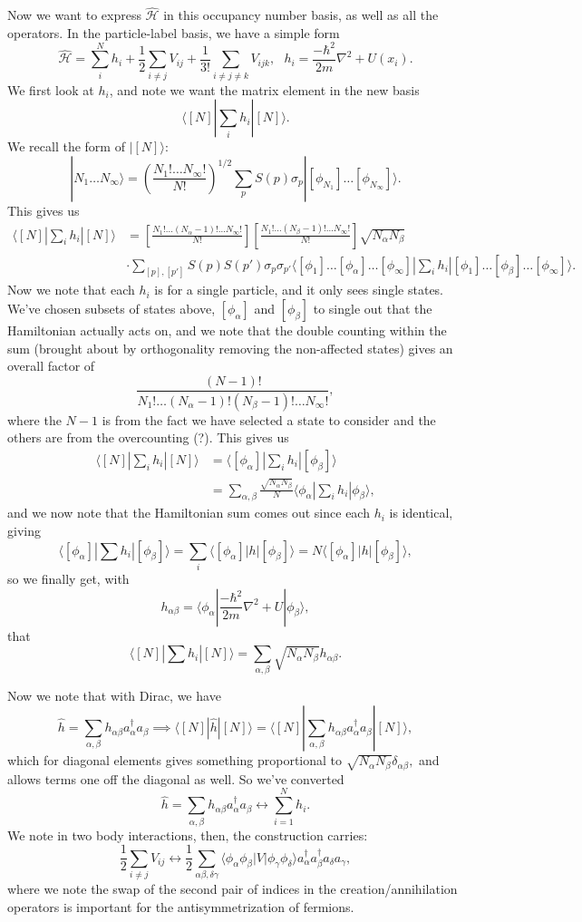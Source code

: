 \documentclass[fontsize=12pt]{scrartcl}
\newcommand{\la}{\langle}
\newcommand{\ra}{\rangle}
\newcommand{\Ham}{\hat{\mathcal{H}}}
\begin{document}
Now we want to express $\Ham$ in this occupancy number basis, as  well as all the operators. In the particle-label basis, we have a simple form $$\Ham=\sum_i^N h_i + \frac{1}{2}\sum_{i\neq j} V_{ij} + \frac{1}{3!}\sum_{i\neq j\neq k} V_{ijk}, \ \ \ h_i = \frac{-\hbar^2}{2m}\nabla^2 + U(x_i).$$ We first look at $h_i$, and note we want the matrix element in the new basis $$\la [N] | \sum_i h_i |[N]\ra.$$ We recall the form of $|[N]\ra$: $$|N_1\dots N_\infty\ra = \left(\frac{N_1!\dots N_\infty!}{N!}\right)^{1/2} \sum_p S(p)\sigma_p|[\phi_{N_1}]\dots[\phi_{N_\infty}]\ra.$$ This gives us \begin{align*} \la [N]|\sum_i h_i |[N]\ra &= \left[\frac{N_1!\dots (N_\alpha-1)!\dots N_\infty!}{N!}\right]\left[\frac{N_1!\dots (N_\beta-1)!\dots N_\infty!}{N!}\right] \sqrt{N_\alpha N_\beta}\\
&\cdot \sum_{[p],[p']}S(p)S(p')\sigma_p\sigma_{p'} \la [\phi_1]\dots [\phi_\alpha]\dots [\phi_\infty]| \sum_i h_i |[\phi_1]\dots[\phi_\beta]\dots[\phi_\infty]\ra.
\end{align*} Now we note that each $h_i$ is for a single particle, and it only sees single states. We've chosen subsets of states above, $[\phi_\alpha]$ and $[\phi_\beta]$ to single out that the Hamiltonian actually acts on, and we note that the double counting within the sum (brought about by orthogonality removing the non-affected states) gives an overall factor of $$\frac{(N-1)!}{N_1!\dots(N_\alpha-1)!(N_\beta-1)!\dots N_\infty!},$$ where the $N-1$ is from the fact we have selected a state to consider and the others are from the overcounting (?). This gives us \begin{align*} 
\la[N]|\sum_i h_i |[N]\ra &= \la [\phi_\alpha]|\sum_i h_i |[\phi_\beta]\ra\\ &= \sum_{\alpha,\beta} \frac{\sqrt{N_\alpha N_\beta}}{N} \la \phi_\alpha|\sum_i h_i |\phi_\beta\ra,	
\end{align*} and we now note that the Hamiltonian sum comes out since each $h_i$ is identical, giving $$\la [\phi_\alpha]|\sum h_i |[\phi_\beta]\ra = \sum_i \la [\phi_\alpha]|h|[\phi_\beta]\ra = N \la [\phi_\alpha]|h|[\phi_\beta]\ra,$$ so we finally get, with $$h_{\alpha\beta} = \la \phi_\alpha| \frac{-\hbar^2}{2m}\nabla^2+U|\phi_\beta\ra,$$ that $$\la[N]|\sum h_i|[N]\ra = \sum_{\alpha,\beta} \sqrt{N_\alpha N_\beta} h_{\alpha\beta}.$$

Now we note that with Dirac, we have $$\hat{h}=\sum_{\alpha,\beta} h_{\alpha\beta}a^\dagger_\alpha a_\beta \implies \la [N]|\hat{h}|[N]\ra = \la [N]|\sum_{\alpha,\beta} h_{\alpha\beta} a^\dagger_\alpha a_\beta |[N]\ra,$$ which for diagonal elements gives something proportional to $\sqrt{N_\alpha N_\beta}\delta_{\alpha\beta},$ and allows terms one off the diagonal as well. So we've converted $$\hat{h} = \sum_{\alpha,\beta} h_{\alpha\beta}a^\dagger_\alpha a_\beta \leftrightarrow \sum_{i=1}^N h_i.$$ We note in two body interactions, then, the construction carries: $$\frac{1}{2}\sum_{i\neq j} V_{ij} \leftrightarrow \frac{1}{2}\sum_{\alpha\beta, \delta\gamma} \la \phi_\alpha\phi_\beta|V|\phi_\gamma\phi_\delta\ra a_\alpha^\dagger a_\beta^\dagger a_\delta a_\gamma,$$ where we note the swap of the second pair of indices in the creation/annihilation operators is important for the antisymmetrization of fermions.
\end{document}
